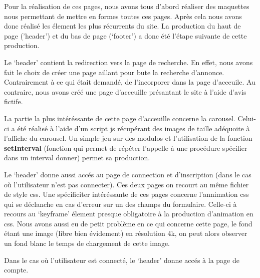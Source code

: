 \documentclass[12pt]{article}
\begin{document}
    Pour la réalisation de ces pages, nous avons tous d'abord réaliser des 
    maquettes nous permettant de mettre en formes toutes ces pages. Après cela 
    nous avons donc réalisé les élement les plus récurrents du site. La 
    production du haut de page ('header') et du bas de page (`footer') a donc 
    été l'étape suivante de cette production. 

    Le `header' contient la redirection vers la page de recherche. En effet, 
    nous avons fait le choix de créer une page aillant pour bute la recherche 
    d'annonce. Contrairement à ce qui était demandé, de l'incorporer dans la page 
    d'acceuile. Au contraire, nous avons créé une page d'acceuille présantant 
    le site à l'aide d'avis fictife. 

    La partie la plus intéréssante de cette page d'acceuille concerne la 
    carousel. Celui-ci a été réalisé à l'aide d'un script js récupérant des 
    images de taille adéquoite à l'affiche du carousel. Un simple jeu sur des 
    modulos et l'utilisation de la fonction \textbf{setInterval} (fonction qui 
    permet de répéter l'appelle à une procédure spécifier dans un interval 
    donner) permet sa production. 

    Le `header' donne aussi accés au page de connection et d'inscription (dans 
    le cas où l'utilisateur n'est pas connecter). Ces deux pages on recourt au 
    même fichier de style css. Une spécificiter intéréssante de ces pages 
    concerne l'annimation css qui se déclanche en cas d'erreur sur un des champs 
    du formulaire. Celle-ci à recours au `keyframe' élement presque obligatoire 
    à la production d'animation en css. Nous avons aussi eu de petit problème en 
    ce qui concerne cette page, le fond étant une image (libre bien évidement) 
    en résolution 4k, on peut alors observer un fond blanc le temps de 
    chargement de cette image.
    
    Dans le cas où l'utilisateur est connecté, le `header' donne accés à la page 
    de compte. 
    
\end{document}
